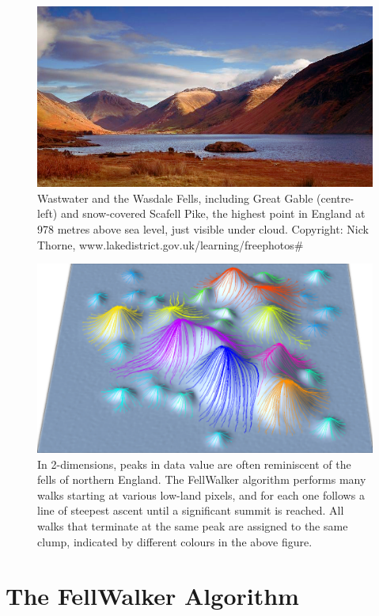 \documentclass[final,authoryear,5p,times,twocolumn]{elsarticle}
\begin{document}
\begin{figure}
\includegraphics[width=\columnwidth]{wasdale}
\caption{Wastwater and the Wasdale Fells, including Great Gable
(centre-left) and snow-covered Scafell Pike, the highest point in England
at 978 metres above sea level, just visible under cloud. Copyright: Nick
Thorne, www.lakedistrict.gov.uk/learning/freephotos\# }
\label{fig:wasdale}
\end{figure}

\begin{figure}
\includegraphics[width=\columnwidth]{fellwalking}
\caption{In 2-dimensions, peaks in data value are often reminiscent of the
fells of northern England. The FellWalker algorithm performs many walks
starting at various low-land pixels, and for each one follows a line of steepest ascent
until a significant summit is reached. All walks that terminate at the
same peak are assigned to the same clump, indicated by different colours
in the above figure.}
\label{fig:fellwalking}
\end{figure}

\section{The FellWalker Algorithm}
\end{document}

